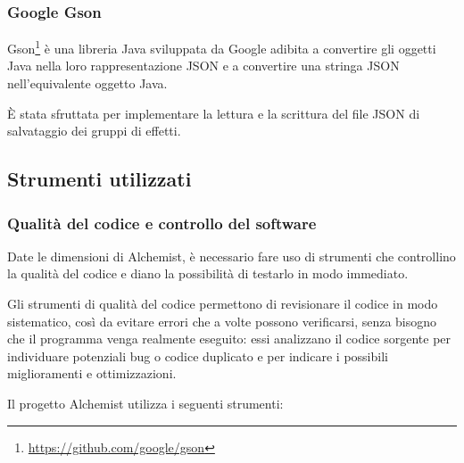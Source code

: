             \subsubsection{Google Gson}\label{subsub:gson}
                Gson\footnote{\url{https://github.com/google/gson}} è una libreria Java  sviluppata da Google adibita a convertire gli oggetti Java nella loro rappresentazione JSON e a convertire una stringa JSON nell'equivalente oggetto Java.

                È stata sfruttata per implementare la lettura e la scrittura del file JSON di salvataggio dei gruppi di effetti.

        \subsection{Strumenti utilizzati}\label{sub:strum}
            \subsubsection{Qualità del codice e controllo del software}\label{subsub:codeQuality}
                Date le dimensioni di Alchemist, è necessario fare uso di strumenti che controllino la qualità del codice e diano la possibilità di testarlo in modo immediato.

                Gli strumenti di qualità del codice permettono di revisionare il codice in modo sistematico, così da evitare errori che a volte possono verificarsi, senza bisogno che il programma venga realmente eseguito: essi analizzano il codice sorgente per individuare potenziali bug o codice duplicato e per indicare i possibili miglioramenti e ottimizzazioni.

                Il progetto Alchemist utilizza i seguenti strumenti:

